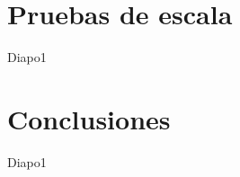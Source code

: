 \documentclass[xcolor=svgnames]{beamer}
\begin{document}
\section{Pruebas de escala}

\begin{frame}{}
	\tableofcontents[currentsection]
\end{frame}

\begin{frame}{Diapo1}
	
\end{frame}





\section{Conclusiones}

\begin{frame}{}
	\tableofcontents[currentsection]
\end{frame}

\begin{frame}{Diapo1}
	
\end{frame}
\end{document}
